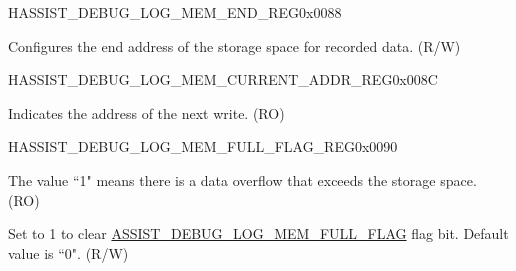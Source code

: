 \begin{register}{H}{ASSIST\_DEBUG\_LOG\_MEM\_END\_REG}{0x0088}\label{regdesc:ASSISTDEBUGLOGMEMENDREG}
%
\regnewline%
\begin{regdesc}\begin{reglist}
\label{fielddesc:ASSISTDEBUGLOGMEMEND}\item [ASSIST\_DEBUG\_LOG\_MEM\_END] Configures the end address of the storage space for recorded data. (R/W)
\end{reglist}\end{regdesc}
\end{register}


\begin{register}{H}{ASSIST\_DEBUG\_LOG\_MEM\_CURRENT\_ADDR\_REG}{0x008C}\label{regdesc:ASSISTDEBUGLOGMEMCURRENTADDRREG}
%
\regnewline%
\begin{regdesc}\begin{reglist}
\label{fielddesc:ASSISTDEBUGLOGMEMWRITINGADDR}\item [ASSIST\_DEBUG\_LOG\_MEM\_WRITING\_ADDR] Indicates the address of the next write. (RO)
\end{reglist}\end{regdesc}
\end{register}


\begin{register}{H}{ASSIST\_DEBUG\_LOG\_MEM\_FULL\_FLAG\_REG}{0x0090}\label{regdesc:ASSISTDEBUGLOGMEMFULLFLAGREG}
%
%
%
\regnewline%
\begin{regdesc}\begin{reglist}
\label{fielddesc:ASSISTDEBUGLOGMEMFULLFLAG}\item [ASSIST\_DEBUG\_LOG\_MEM\_FULL\_FLAG] The value ``1" means there is a data overflow that exceeds the storage space. (RO)
\label{fielddesc:ASSISTDEBUGCLRLOGMEMFULLFLAG}\item [ASSIST\_DEBUG\_CLR\_LOG\_MEM\_FULL\_FLAG] Set to 1 to clear \hyperref[fielddesc:ASSISTDEBUGLOGMEMFULLFLAG]{ASSIST\_DEBUG\_LOG\_MEM\_FULL\_FLAG} flag bit. Default value is ``0". (R/W)
\end{reglist}\end{regdesc}
\end{register}


